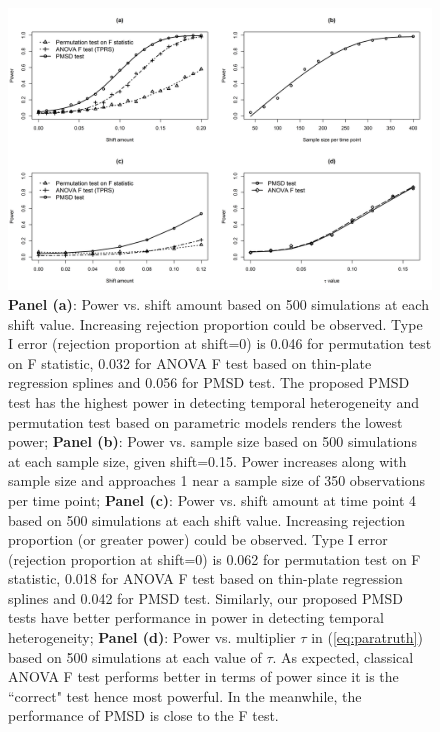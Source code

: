 	\begin{figure}[h]
		\centering
		\includegraphics[width=\linewidth]{Figures/Chap3/Plot2b2XL1.png}
		\caption{\textbf{Panel (a)}: Power vs. shift amount based on 500 simulations at each shift value. Increasing rejection proportion could be observed. Type I error (rejection proportion at shift=0) is 0.046 for permutation test on F statistic, 0.032 for ANOVA F test based on thin-plate regression splines and 0.056 for PMSD test. The proposed PMSD test has the highest power in detecting temporal heterogeneity and permutation test based on parametric models renders the lowest power; 
			\textbf{Panel (b)}: Power vs. sample size based on 500 simulations at each sample size, given shift=0.15. Power increases along with sample size and approaches 1 near a sample size of 350 observations per time point; 
			\textbf{Panel (c)}: Power vs. shift amount at time point 4 based on 500 simulations at each shift value. Increasing rejection proportion (or greater power) could be observed. Type I error (rejection proportion at shift=0) is 0.062 for permutation test on F statistic, 0.018 for ANOVA F test based on thin-plate regression splines and 0.042 for PMSD test. Similarly, our proposed PMSD tests have better performance in power in detecting temporal heterogeneity;
			\textbf{Panel (d)}: Power vs. multiplier $\tau$ in (\ref{eq:paratruth}) based on 500 simulations at each value of $\tau$. As expected, classical ANOVA F test performs better in terms of power since it is the ``correct" test hence most powerful. In the meanwhile, the performance of PMSD is close to the F test.}
		\label{fig:twobtwo}
	\end{figure}
	
